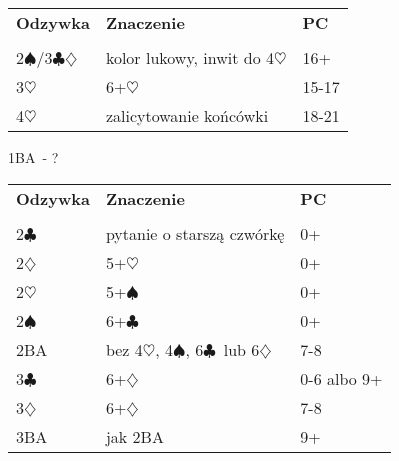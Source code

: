 \documentclass{article}
\renewcommand{\c}{\(\clubsuit\)}
\renewcommand{\d}{\(\diamondsuit\)}
\newcommand{\h}{\(\heartsuit\)}
\newcommand{\s}{\(\spadesuit\)}
\begin{document}
\begin{tabular}{p{2cm} p{10cm} l}
	\textbf{Odzywka} & \textbf{Znaczenie} & \textbf{PC}\\\\
	2\s/3\c\d & kolor lukowy\footnotemark, inwit do 4\h & 16+ \\
	3\h & 6+\h & 15-17 \\
	4\h & zalicytowanie końcówki & 18-21 \\
\end{tabular}
\newpage
\begin{center}\LARGE{1BA\ - ?}
\end{center}

\begin{tabular}{p{2cm} p{10cm} l}
	\textbf{Odzywka} & \textbf{Znaczenie} & \textbf{PC}\\\\
	2\c & pytanie o starszą czwórkę & 0+ \\
	2\d & 5+\h & 0+ \\
	2\h & 5+\s & 0+ \\
	2\s & 6+\c & 0+ \\
	2BA & bez 4\h, 4\s, 6\c\ lub 6\d & 7-8 \\
	3\c & 6+\d & 0-6 albo 9+ \\
	3\d & 6+\d & 7-8 \\
	3BA & jak 2BA & 9+ \\
\end{tabular}
\end{document}
